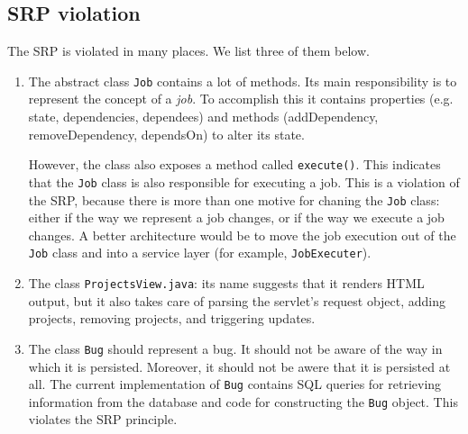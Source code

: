 \documentclass{article}
\begin{document}
\subsection{SRP violation}
\label{sec:srp}
The SRP is violated in many places. We list three of them below.

\begin{enumerate}
\item The abstract class \verb|Job| contains a lot of methods. Its main responsibility is to represent the concept of a \emph{job}. To accomplish this it contains properties (e.g. state, dependencies, dependees) and methods (addDependency, removeDependency, dependsOn) to alter its state.

However, the class also exposes a method called \verb|execute()|. This indicates that the \verb|Job| class is also responsible for executing a job. This is a violation of the SRP, because there is more than one motive for chaning the \verb|Job| class: either if the way we represent a job changes, or if the way we execute a job changes. A better architecture would be to move the job execution out of the \verb|Job| class and into a service layer (for example, \verb|JobExecuter|).

\item The class \verb|ProjectsView.java|: its name suggests that it renders HTML output, but it also takes care of parsing the servlet's request object, adding projects, removing projects, and triggering updates.

\item The class \verb|Bug| should represent a bug. It should not be aware of the way in which it is persisted. Moreover, it should not be awere that it is persisted at all. The current implementation of \verb|Bug| contains SQL queries for retrieving information from the database and code for constructing the \verb|Bug| object. This violates the SRP principle.

\end{enumerate}
\end{document}
